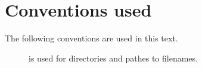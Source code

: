 \section{Conventions used}

The following conventions are used in this text.

\renewcommand*{\descriptionlabel}[1]{\hspace\labelsep\normalfont #1}
\begin{description}
\item[] is used for directories and pathes to filenames.
\end{description}

